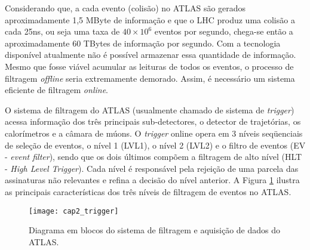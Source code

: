 Considerando que, a cada evento (colisão) no ATLAS são gerados
aproximadamente 1,5 MByte de informação e que o LHC produz uma
colisão a cada 25ns, ou seja uma taxa de $40\times 10^6$ eventos por
segundo, chega-se então a aproximadamente 60 TBytes de informação
por segundo. Com a tecnologia disponível atualmente não é possível
armazenar essa quantidade de informação. Mesmo que fosse viável
acumular as leituras de todos os eventos, o processo de filtragem
\textit{offline} seria extremamente demorado. Assim, é necessário um
sistema eficiente de filtragem \textit{online}.

O sistema de filtragem do ATLAS (usualmente chamado de sistema de
\textit{trigger}) acessa informação dos três principais
sub-detectores, o detector de trajetórias, os calorímetros e a
câmara de múons. O \textit{trigger} online opera em 3 níveis
seqüenciais de seleção de eventos, o nível 1 (LVL1), o nível 2
(LVL2) e o filtro de eventos (EV - \textit{event filter}), sendo que
os dois últimos compõem a filtragem de alto nível (HLT -
\textit{High Level Trigger}). Cada nível é responsável pela rejeição
de uma parcela das assinaturas não relevantes e refina a decisão do
nível anterior. A Figura \ref{trigger} ilustra as principais
características dos três níveis de filtragem de eventos no ATLAS.

\begin{figure}[h!] \centering
\texttt{[image: cap2\_trigger]}
\caption{Diagrama em blocos do sistema de filtragem e aquisição de
dados do ATLAS.} \label{trigger}
\end{figure}

